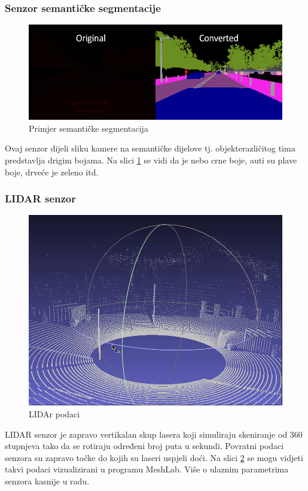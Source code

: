 \subsubsection{Senzor semantičke segmentacije}
\begin{figure}[ht!]
  \centering
  \includegraphics[scale=0.5]{images/sem_seg_exmaple.png}
  \caption{Primjer semantičke segmentacija}
  \label{fig:sem_seg_exmaple}
\end{figure}
Ovaj senzor dijeli sliku kamere na semantičke dijelove tj. objekterazličitog tima predstavlja drigim bojama. Na slici \ref{fig:sem_seg_exmaple} se vidi da je nebo crne boje, auti su plave boje, drveće je zeleno itd.

\subsubsection{LIDAR senzor}
\begin{figure}[ht!]
  \centering
  \includegraphics[scale=0.5]{images/LIDAR_examaple.png}
  \caption{LIDAr podaci}
  \label{fig:lidar_exmaple}
\end{figure}
LIDAR senzor je zapravo vertikalan skup lasera koji simuliraju skeniranje od 360 stupnjeva tako da se rotiraju određeni broj puta u sekundi. Povratni podaci senzora su zapravo točke do kojih su laseri uspjeli doći. Na slici \ref{fig:lidar_exmaple} se mogu vidjeti takvi podaci vizualizirani u programu MeshLab. Više o ulaznim parametrima senzora kasnije u radu.

